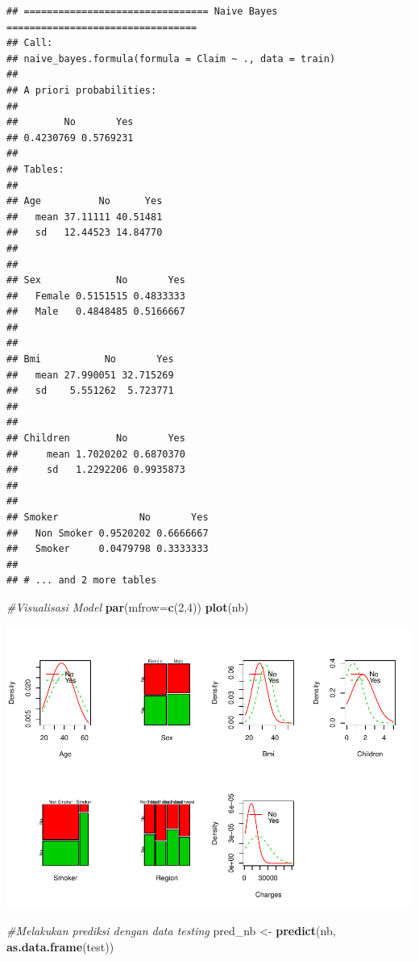 \documentclass[]{article}
\newenvironment{Shaded}{\begin{snugshade}}{\end{snugshade}}
\newcommand{\CommentTok}[1]{\textcolor[rgb]{0.56,0.35,0.01}{\textit{#1}}}
\newcommand{\DataTypeTok}[1]{\textcolor[rgb]{0.13,0.29,0.53}{#1}}
\newcommand{\DecValTok}[1]{\textcolor[rgb]{0.00,0.00,0.81}{#1}}
\newcommand{\KeywordTok}[1]{\textcolor[rgb]{0.13,0.29,0.53}{\textbf{#1}}}
\newcommand{\NormalTok}[1]{#1}
\newcommand{\StringTok}[1]{\textcolor[rgb]{0.31,0.60,0.02}{#1}}
\begin{document}
\begin{verbatim}
## ================================ Naive Bayes ================================= 
## Call: 
## naive_bayes.formula(formula = Claim ~ ., data = train)
## 
## A priori probabilities: 
## 
##        No       Yes 
## 0.4230769 0.5769231 
## 
## Tables: 
##       
## Age          No      Yes
##   mean 37.11111 40.51481
##   sd   12.44523 14.84770
## 
##         
## Sex             No       Yes
##   Female 0.5151515 0.4833333
##   Male   0.4848485 0.5166667
## 
##       
## Bmi           No       Yes
##   mean 27.990051 32.715269
##   sd    5.551262  5.723771
## 
##         
## Children        No       Yes
##     mean 1.7020202 0.6870370
##     sd   1.2292206 0.9935873
## 
##             
## Smoker              No       Yes
##   Non Smoker 0.9520202 0.6666667
##   Smoker     0.0479798 0.3333333
## 
## # ... and 2 more tables
\end{verbatim}

\begin{Shaded}
\begin{Highlighting}[]
\CommentTok{#Visualisasi Model}
\KeywordTok{par}\NormalTok{(}\DataTypeTok{mfrow=}\KeywordTok{c}\NormalTok{(}\DecValTok{2}\NormalTok{,}\DecValTok{4}\NormalTok{))}
\KeywordTok{plot}\NormalTok{(nb)}
\end{Highlighting}
\end{Shaded}

\includegraphics{2_Classification_Model_files/figure-latex/unnamed-chunk-17-1.pdf}

\begin{Shaded}
\begin{Highlighting}[]
\CommentTok{#Melakukan prediksi dengan data testing}
\NormalTok{pred_nb <-}\StringTok{ }\KeywordTok{predict}\NormalTok{(nb, }\KeywordTok{as.data.frame}\NormalTok{(test))}
\end{Highlighting}
\end{Shaded}
\end{document}
